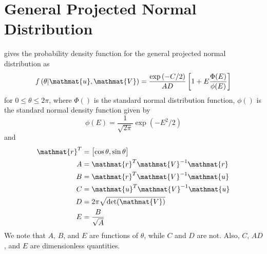 \documentclass[12pt]{report}
\newcommand{\mat}[1]{\mathmat{#1}}
\begin{document}
\newpage
\section{General Projected Normal Distribution}\label{10.1.1}
\citet[(1)]{Hernandez2017} gives the probability density function for the general projected normal distribution as
%
\begin{equation}\label{10.1.2}
    f\left( \theta | \mat{u}, \mat{V} \right)
    = \frac{\exp{(-C/2)}}{AD} \left[ 1 + E \frac{\Phi(E)}{\phi(E)} \right]
\end{equation}
%
for $0 \le \theta \le 2\pi$, where $\Phi()$ is the standard normal distribution function, $\phi()$ is the standard normal density function given by
%
\begin{equation}\label{10.1.3}
    \phi(E) = \frac{1}{\sqrt{2 \pi}} \exp{\left(-E^2/2\right)}
\end{equation}
%
and
%
\begin{align}
    \mat{r}^T &= \begin{bmatrix}\cos{\theta}, \sin{\theta} \end{bmatrix} \\
    A &= \mat{r}^T \mat{V}^{-1} \mat{r} \\
    B &= \mat{r}^T \mat{V}^{-1} \mat{u} \\
    C &= \mat{u}^T \mat{V}^{-1} \mat{u} \\
    D &= 2 \pi \sqrt{\text{det}(\mat{V})} \\
    E &= \frac{B}{\sqrt{A}}
\end{align}
%
We note that $A$, $B$, and $E$ are functions of $\theta$, while $C$ and $D$ are not. Also, $C$, $AD$, and $E$ are dimensionless quantities.
\end{document}
